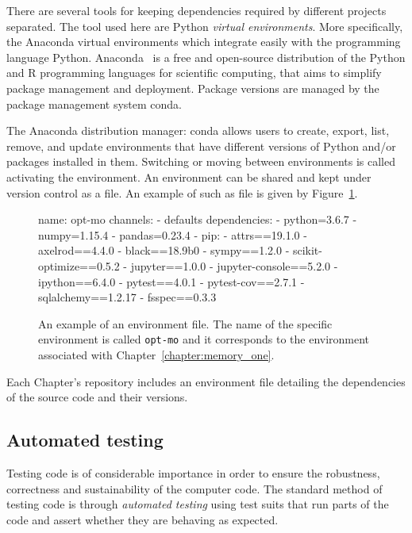 There are several tools for keeping dependencies required by different projects
separated. The tool used here are Python \textit{virtual environments}. More
specifically, the Anaconda virtual environments which integrate easily with the
programming language Python. Anaconda~\cite{anaconda} is a free and open-source distribution of
the Python and R programming languages for scientific computing, that aims to
simplify package management and deployment. Package versions are managed by the
package management system conda.

The Anaconda
distribution manager: conda allows users to create, export, list, remove, and update environments that
have different versions of Python and/or packages installed in them. Switching
or moving between environments is called activating the environment. An environment
can be shared and kept under version control as a file. An example of
such as file is given by Figure~\ref{fig:environment_file}.

\begin{figure}[!htbp]
\begin{shell}
name: opt-mo
channels:
  - defaults
dependencies:
  - python=3.6.7
  - numpy=1.15.4
  - pandas=0.23.4
  - pip:
    - attrs==19.1.0
    - axelrod==4.4.0
    - black==18.9b0
    - sympy==1.2.0
    - scikit-optimize==0.5.2
    - jupyter==1.0.0
    - jupyter-console==5.2.0
    - ipython==6.4.0
    - pytest==4.0.1
    - pytest-cov==2.7.1
    - sqlalchemy==1.2.17
    - fsspec==0.3.3
\end{shell}
\caption{An example of an environment file. The name of the specific environment is called
\texttt{opt-mo} and it corresponds to the environment associated with
Chapter~\ref{chapter:memory_one}.}\label{fig:environment_file}
\end{figure}

Each Chapter's repository includes an environment file detailing the dependencies
of the source code and their versions.

\subsection{Automated testing}

Testing code is of considerable importance in order to ensure the robustness,
correctness and sustainability of the computer code. The standard method of testing code is through
\textit{automated testing} using test suits that run parts of the code and
assert whether they are behaving as expected.

